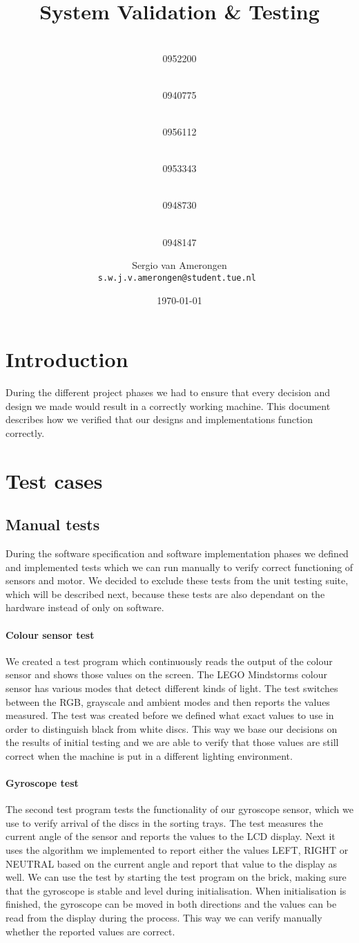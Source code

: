 \documentclass[a4paper,oneside,11pt]{article}
\title{\vspace{-\baselineskip}\sffamily\bfseries System Validation \& Testing}
\author{
	\makebox[.25\linewidth]{Sergio van Amerongen}\\0952200 \and
	\makebox[.25\linewidth]{Stefan Cloudt}\\0940775 \and
	\makebox[.25\linewidth]{Daan de Graaf}\\0956112 \and
	\makebox[.25\linewidth]{Robert van Lente}\\0953343 \and
	\makebox[.25\linewidth]{Tom Peters}\\0948730 \and
	\makebox[.25\linewidth]{Berrie Trippe}\\0948147 
	\and \makebox[.75\linewidth]{\textbf{Responsible:}} \and
	Sergio van Amerongen\\ \tt{s.w.j.v.amerongen@student.tue.nl}
}
\date{\today}
\begin{document}
\maketitle
\section{Introduction}
During the different project phases we had to ensure that every decision and design we made would result in a correctly working machine. This document describes how we verified that our designs and implementations function correctly.

\section{Test cases}
\subsection{Manual tests}
During the software specification and software implementation phases we defined and implemented tests which we can run manually to verify correct functioning of sensors and motor. We decided to exclude these tests from the unit testing suite, which will be described next, because these tests are also dependant on the hardware instead of only on software.

\paragraph{Colour sensor test} We created a test program which continuously reads the output of the colour sensor and shows those values on the screen. The LEGO Mindstorms colour sensor has various modes that detect different kinds of light. The test switches between the RGB, grayscale and ambient modes and then reports the values measured. The test was created before we defined what exact values to use in order to distinguish black from white discs. This way we base our decisions on the results of initial testing and we are able to verify that those values are still correct when the machine is put in a different lighting environment. 

\paragraph{Gyroscope test} The second test program tests the functionality of our gyroscope sensor, which we use to verify arrival of the discs in the sorting trays. The test measures the current angle of the sensor and reports the values to the LCD display. Next it uses the algorithm we implemented to report either the values LEFT, RIGHT or NEUTRAL based on the current angle and report that value to the display as well. We can use the test by starting the test program on the brick, making sure that the gyroscope is stable and level during initialisation. When initialisation is finished, the gyroscope can be moved in both directions and the values can be read from the display during the process. This way we can verify manually whether the reported values are correct. 
\end{document}
